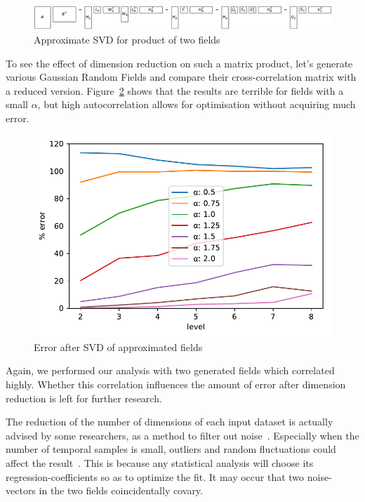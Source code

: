 \documentclass{acm_proc_article-sp}
\begin{document}
\begin{figure}[h]
\begin{center}
\includegraphics[width=\columnwidth]{Results/randomisedSquareProductSVD.pdf}
\caption[Approximate product SVD]{Approximate SVD for product of two fields}
\label{fig:randomisedSquareProductSVD}
\end{center}
\end{figure}
To see the effect of dimension reduction on such a matrix product, let's generate various Gaussian Random Fields and compare their cross-correlation matrix with a reduced version. Figure~\ref{fig:plotRandomisedSizeReducedMatrixProduct} shows that the results are terrible for fields with a small $\alpha$, but high autocorrelation allows for optimisation without acquiring much error.
\begin{figure}[h]
\begin{center}
\includegraphics[width=0.8\columnwidth]{Results/plotRandomisedSizeReducedMatrixProduct.pdf}
\caption[Error after SVD]{Error after SVD of approximated fields}
\label{fig:plotRandomisedSizeReducedMatrixProduct}
\end{center}
\end{figure}
Again, we performed our analysis with two generated fields which correlated highly. Whether this correlation influences the amount of error after dimension reduction is left for further research.

The reduction of the number of dimensions of each input dataset is actually advised by some researchers, as a method to filter out noise~\cite{Barnett1987}. Especially when the number of temporal samples is small, outliers and random fluctuations could affect the result~\cite{Bretherton1992}. This is because any statistical analysis will choose its regression-coefficients so as to optimize the fit. It may occur that two noise-vectors in the two fields coincidentally covary.
\end{document}
